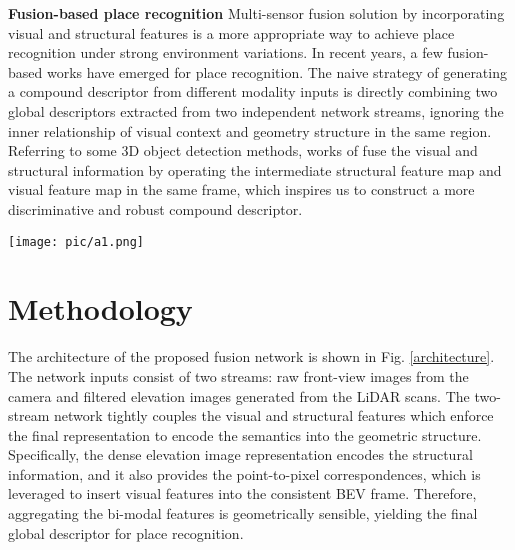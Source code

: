 \documentclass[letterpaper, 10 pt, conference]{ieeeconf}  \usepackage{tabularx}
\begin{document}
\textbf{Fusion-based place recognition} Multi-sensor fusion solution by incorporating visual and structural features is a more appropriate way to achieve place recognition under strong environment variations. In recent years, a few fusion-based works have emerged for place recognition. The naive strategy \cite{xie2020large, oertel2020augmenting} of generating a compound descriptor from different modality inputs is directly combining two global descriptors extracted from two independent network streams, ignoring the inner relationship of visual context and geometry structure in the same region. Referring to some 3D object detection methods, works of \cite{wang2018fusing, liang2018deep} fuse the visual and structural information by operating the intermediate structural feature map and visual feature map in the same frame, which inspires us to construct a more discriminative and robust compound descriptor.  

\begin{figure*}[tp]
	\centering
	\vspace{3mm}
	\texttt{[image: pic/a1.png]}

	\caption{The network architecture of CORAL-VLAD. The network inputs an elevation image generated by LiDAR scans and a visual image, and then outputs a global descriptor to predict the most similar scene on the reference database.  shows multi-scale visual feature map from the output of FPN layer,  shows the BEV visual feature map from the ouput of projection layer.}
	\label{architecture}
	\vspace{-10pt}
\end{figure*}

\section{Methodology}

The architecture of the proposed fusion network is shown in Fig. \ref{architecture}. The network inputs consist of two streams: raw front-view images from the camera and filtered elevation images generated from the LiDAR scans. The two-stream network tightly couples the visual and structural features which enforce the final representation to encode the semantics into the geometric structure. Specifically, the dense elevation image representation encodes the structural information, and it also provides the point-to-pixel correspondences, which is leveraged to insert visual features into the consistent BEV frame. Therefore, aggregating the bi-modal features is geometrically sensible, yielding the final global descriptor for place recognition.
\end{document}
